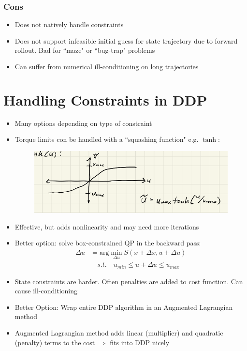 \documentclass[11pt]{article}
\begin{document}
\subsubsection{Cons}
\begin{itemize}
    \item Does not natively handle constraints
    \item Does not support infeasible initial guess for state trajectory due to forward rollout. Bad for ``maze" or ``bug-trap" problems
    \item Can suffer from numerical ill-conditioning on long trajectories
\end{itemize}

\section{Handling Constraints in DDP}
\begin{itemize}
    \item Many options depending on type of constraint
    \item Torque limits con be handled with a ``squashing function" e.g. $\tanh:$
    \begin{figure}[H]
        \centering
        \includegraphics[width=0.9\linewidth]{lecture_12_1.png}
    \end{figure}
    \item Effective, but adds nonlinearity and may need more iterations
    \item Better option: solve box-constrained QP in the backward pass:
    \begin{align*}
        \Delta u &= \text{arg}\min_{\Delta u} S(x+\Delta x, u + \Delta u)
        \\
        &\quad s.t. \quad u_{min}\leq u+\Delta u \leq u_{max}
    \end{align*}
    \item State constraints are harder. Often penalties are added to cost function. Can cause ill-conditioning
    \item Better Option: Wrap entire DDP algorithm in an Augmented Lagrangian method
    \item Augmented Lagrangian method adds linear (multiplier) and quadratic (penalty) terms to the cost $\Rightarrow$ fits into DDP nicely
\end{itemize}
\end{document}
